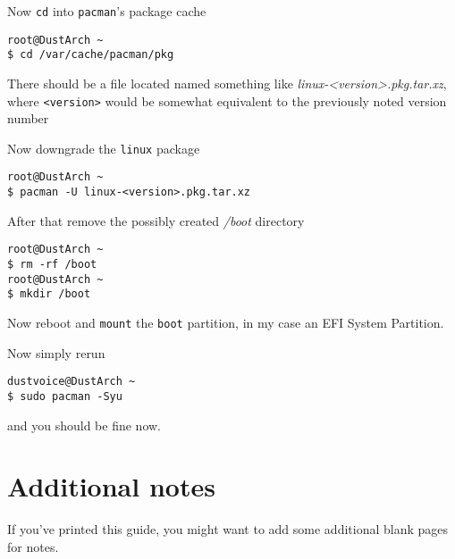 \documentclass[10pt]{dustdoc}
\begin{document}
Now \texttt{cd} into \texttt{pacman}'s package cache

\begin{verbatim}
root@DustArch ~
$ cd /var/cache/pacman/pkg
\end{verbatim}

There should be a file located named something like \textit{linux-<version>.pkg.tar.xz}, where \texttt{<version>} would be somewhat equivalent to the previously noted version number

Now downgrade the \texttt{linux} package

\begin{verbatim}
root@DustArch ~
$ pacman -U linux-<version>.pkg.tar.xz
\end{verbatim}

After that remove the possibly created \textit{/boot} directory

\begin{verbatim}
root@DustArch ~
$ rm -rf /boot
root@DustArch ~
$ mkdir /boot
\end{verbatim}

Now reboot and \texttt{mount} the \texttt{boot} partition, in my case an EFI System Partition.

Now simply rerun

\begin{verbatim}
dustvoice@DustArch ~
$ sudo pacman -Syu
\end{verbatim}

\noindent
and you should be fine now.

\chapter{Additional notes}
\label{sec:additional-notes}

If you’ve printed this guide, you might want to add some additional blank pages for notes.
\end{document}
